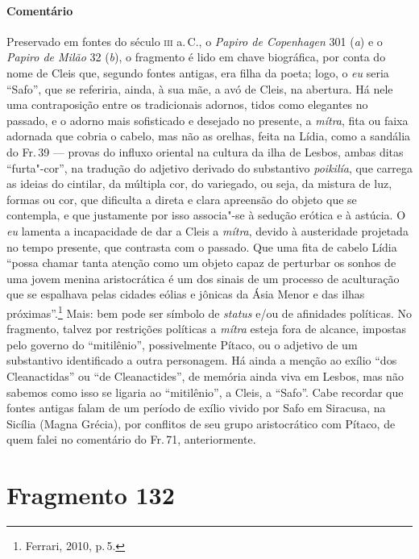 {\paragraph{Comentário} Preservado em fontes do século \textsc{iii} a.\,C., o \emph{Papiro de Copenhagen} 301 (\emph{a}) e o \emph{Papiro de Milão} 32 (\emph{b}),
o fragmento é lido em chave biográfica, por conta do
nome de Cleis que, segundo fontes antigas, era filha da poeta; logo, o \emph{eu} seria
``Safo'', que se referiria, ainda, à sua mãe, a avó de Cleis, na
abertura. Há nele uma contraposição entre os tradicionais adornos, tidos como
elegantes no passado, e o adorno mais sofisticado e desejado no presente, a
\emph{mítra}, fita ou faixa adornada que cobria o cabelo, mas não as orelhas,
feita na Lídia, como a sandália do Fr.\,39 --- provas do influxo oriental na
cultura da ilha de Lesbos, ambas ditas ``furta"-cor'', na tradução do
adjetivo derivado do substantivo \emph{poikilía}, que carrega as ideias do
cintilar, da múltipla cor, do variegado, ou seja, da mistura de luz, formas ou
cor, que dificulta a direta e clara apreensão do objeto que se contempla, e que
justamente por isso associa"-se à sedução erótica e à astúcia. O \emph{eu} lamenta a
incapacidade de dar a Cleis a \emph{mítra}, devido à austeridade projetada no tempo presente, que contrasta com o passado. Que uma fita de cabelo Lídia ``possa chamar tanta atenção como um objeto capaz de perturbar os sonhos de uma jovem menina aristocrática é um dos sinais de um processo de aculturação que se espalhava pelas cidades eólias e jônicas da Ásia Menor e das ilhas próximas''.\footnote{Ferrari, 2010, p.\,5.} Mais: bem pode ser símbolo de \emph{status} e/ou de afinidades políticas. No fragmento, talvez por restrições políticas a \emph{mítra} esteja fora de alcance,  impostas pelo governo do ``mitilênio'', possivelmente
Pítaco, ou o adjetivo de um substantivo identificado a outra personagem. Há
ainda a menção ao exílio ``dos Cleanactidas'' ou ``de Cleanactides'', de memória
ainda viva em Lesbos, mas não sabemos como isso se ligaria ao
``mitilênio'', a Cleis, a ``Safo''. Cabe recordar que fontes antigas falam
de um período de exílio vivido por Safo em Siracusa, na Sicília (Magna Grécia),
por conflitos de seu grupo aristocrático com Pítaco, de quem falei no comentário do Fr.\,71, anteriormente.}


\section{Fragmento 132}

